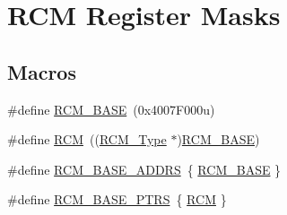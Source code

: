 \hypertarget{group___r_c_m___register___masks}{}\section{R\+CM Register Masks}
\label{group___r_c_m___register___masks}
\subsection*{Macros}
\begin{DoxyCompactItemize}
\item 
\#define \mbox{\hyperlink{group___r_c_m___register___masks_ga0f155ee1b03b8a20749da74c4f19d34d}{R\+C\+M\+\_\+\+B\+A\+SE}}~(0x4007\+F000u)
\item 
\#define \mbox{\hyperlink{group___r_c_m___register___masks_gaa5c5e6af3b266654facbd52caa0b8874}{R\+CM}}~((\mbox{\hyperlink{struct_r_c_m___type}{R\+C\+M\+\_\+\+Type}} $\ast$)\mbox{\hyperlink{group___r_c_m___register___masks_ga0f155ee1b03b8a20749da74c4f19d34d}{R\+C\+M\+\_\+\+B\+A\+SE}})
\item 
\#define \mbox{\hyperlink{group___r_c_m___register___masks_gaf3db57eb66e9dc48fcac7ebf4e6884c6}{R\+C\+M\+\_\+\+B\+A\+S\+E\+\_\+\+A\+D\+D\+RS}}~\{ \mbox{\hyperlink{group___r_c_m___register___masks_ga0f155ee1b03b8a20749da74c4f19d34d}{R\+C\+M\+\_\+\+B\+A\+SE}} \}
\item 
\#define \mbox{\hyperlink{group___r_c_m___register___masks_gad8549fec4a09b0b485983beadfc3a5fb}{R\+C\+M\+\_\+\+B\+A\+S\+E\+\_\+\+P\+T\+RS}}~\{ \mbox{\hyperlink{group___r_c_m___register___masks_gaa5c5e6af3b266654facbd52caa0b8874}{R\+CM}} \}
\end{DoxyCompactItemize}

